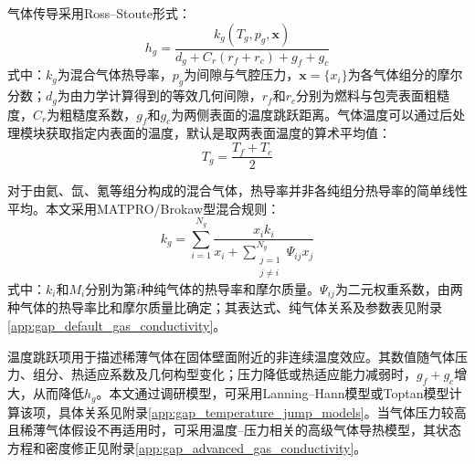 
气体传导采用Ross--Stoute形式\cite{rossHEATTRANSFERCOEFFICIENT1962,halesBISONTheoryManual2016}：
\begin{equation}
	h_g
	=\frac{k_g\!\left(T_g,p_g,\boldsymbol{x}\right)}
	{d_g+C_r\left(r_f+r_c\right)+g_f+g_c}
	\label{eq:gap_gas_conductance}
\end{equation}
式中：$k_g$为混合气体热导率，$p_g$为间隙与气腔压力，$\boldsymbol{x}=\{x_i\}$为各气体组分的摩尔分数；$d_g$为由力学计算得到的等效几何间隙，$r_f$和$r_c$分别为燃料与包壳表面粗糙度，$C_r$为粗糙度系数，$g_f$和$g_c$为两侧表面的温度跳跃距离。气体温度可以通过后处理模块获取指定内表面的温度，默认是取两表面温度的算术平均值：
\begin{equation}
	T_g=\frac{T_f+T_c}{2}
	\label{eq:gap_gas_temperature}
\end{equation}

对于由氦、氙、氪等组分构成的混合气体，热导率并非各纯组分热导率的简单线性平均。本文采用MATPRO/Brokaw型混合规则\cite{hagrmanSCDAPRELAP5MOD1995,brokawApproximateFormulasViscosity1958}：
\begin{equation}
	k_g
	=\sum_{i=1}^{N_g}
	\frac{x_i k_i}
	{x_i+\displaystyle\sum_{\substack{j=1\\j\ne i}}^{N_g}
		\Psi_{ij}x_j}
	\label{eq:gap_gas_mixture_conductivity}
\end{equation}
式中：$k_i$和$M_i$分别为第$i$种纯气体的热导率和摩尔质量。$\Psi_{ij}$为二元权重系数，由两种气体的热导率比和摩尔质量比确定；其表达式、纯气体关系及参数表见附录\ref{app:gap_default_gas_conductivity}。

温度跳跃项用于描述稀薄气体在固体壁面附近的非连续温度效应。其数值随气体压力、组分、热适应系数及几何构型变化；压力降低或热适应能力减弱时，$g_f+g_c$增大，从而降低$h_g$。本文通过调研模型，可采用Lanning--Hann模型或Toptan模型计算该项\cite{lanningReviewMethodsApplicable1975,toptanGapConductanceModeling2019,toptanModelingGapConductance2020}，具体关系见附录\ref{app:gap_temperature_jump_models}。当气体压力较高且稀薄气体假设不再适用时，可采用温度--压力相关的高级气体导热模型，其状态方程和密度修正见附录\ref{app:gap_advanced_gas_conductivity}。


